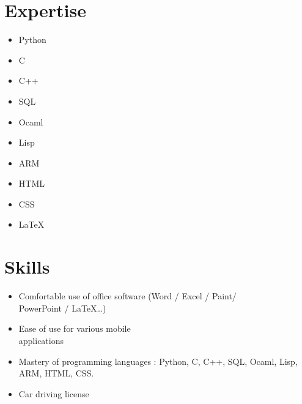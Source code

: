 \documentclass[9pt, oneside, a4paper, titlepage]{extarticle}
\begin{document}
\begin{tcolorbox}
\begin{minipage}[t]{6.2cm}
\begin{spacing}{0.95}
\begin{tcolorbox}[grow to left by = 0.6cm, colback = gray!25, colframe = white]
                \section*{Expertise}
                \begin{multicols}{2}
                \begin{itemize}
                    \item Python
                    \item C
                    \item C++
                    \item SQL
                    \item Ocaml
                    \columnbreak                    
                    \item Lisp
                    \item ARM
                    \item HTML
                    \item CSS
                    \item \LaTeX
                \end{itemize}
                \end{multicols}
                \vspace*{0.2cm}
                \section*{Skills}

                \begin{itemize}
                    \vspace*{0.3cm}
                    \item Comfortable use of office software (Word / Excel / Paint/ \\PowerPoint / \LaTeX \ldots)
                    \vspace*{0.2cm}
                    \item Ease of use for various mobile \\applications
                    \vspace*{0.2cm}
                    \item Mastery of programming languages : Python, C, C++, SQL, Ocaml, Lisp, ARM, HTML, CSS.
                    \vspace*{0.2cm}
                    \item Car driving license

                \end{itemize}



\end{tcolorbox}
\end{spacing}
\end{minipage}
\end{tcolorbox}
\end{document}
